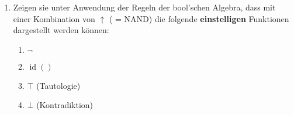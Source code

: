 \documentclass[paper=a4,fontsize=11pt]{scrartcl}%
\numberwithin{equation}{section}
\newenvironment{solution}
	{
		\color{Blue}
		\textbf{Lösung:}
	}{}
\DeclareMathOperator{\id}{id}
\begin{document}
\begin{enumerate}
\begin{enumerate}
		\begin{solution}
		\begin{align*}
		&~ x \Rightarrow (y \Rightarrow z)\\
		&= \overline{x} \lor (y \Rightarrow z)\\
		&= \overline{x} \lor (\overline{y} \lor z)\\
		&= (\overline{x} \lor \overline{y}) \lor z\\
		&= \overline{\overline{(\overline{x} \lor \overline{y}) \lor z}}\\
		&= \overline{(\overline{x \lor \overline{y})})\land \overline{z}}\\
		&= \overline{(\overline{\overline{(x \land y)}}\land \overline{z}}\\
		&= \overline{\overline{\overline{(x \land y)} \land \overline{(x \land y)}} \land \overline{z \land z}}
		\end{align*}
		\end{solution}
		\item $\varphi_3 := \overline{x \land y} \lor \overline{x \land \overline{z}}$
		
		\begin{solution}
		\begin{align*}
		&~ \overline{x \land y} \lor \overline{x \land \overline{z}}\\
		&= \overline{x} \lor \overline{y} \lor \overline{x} \lor z\\
		&= \overline{x} \lor \overline{y} \lor z\\
		&= \overline{x} \lor (\overline{y} \lor z)\\
		&= \overline{x} \lor (y \Rightarrow z)\\
		&= x \Rightarrow (y \Rightarrow z)
		\end{align*}
		\end{solution}
	\end{enumerate}
	Stellen sie $\varphi_1$ unter ausschließlicher Verwendung der NOR-Funktion, $\varphi_2$ unter ausschließlicher Verwendung der NAND-Funktion und $\varphi_3$ unter ausschließlicher Verwendung der Implikation dar.
	\item Zeigen sie unter Anwendung der Regeln der bool'schen Algebra, dass mit einer Kombination von $\uparrow$ ( = NAND) die folgende \textbf{einstelligen} Funktionen dargestellt werden können:
	\begin{enumerate}
		\item $\neg $
		\item $ \id()$
		\item $\top$ (Tautologie)
		\item $\bot$ (Kontradiktion)
	\end{enumerate}
	

\end{enumerate}
\end{document}
